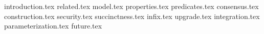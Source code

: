 {introduction.tex}
{related.tex}
{model.tex}
{properties.tex}
{predicates.tex}
{consensus.tex}
{construction.tex}
{security.tex}
{succinctness.tex}
{infix.tex}
{upgrade.tex}
{integration.tex}
{parameterization.tex}
{future.tex}

